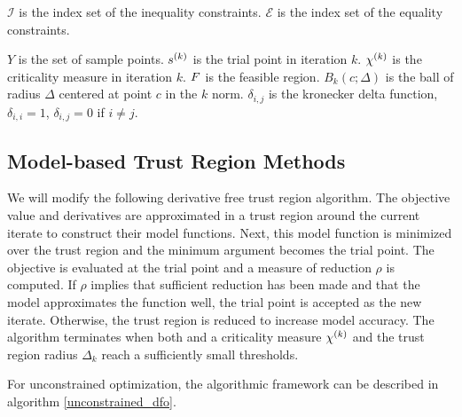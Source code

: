 $\mathcal{I}$ is the index set of the inequality constraints.
$\mathcal{E}$ is the index set of the equality constraints.

$Y$ is the set of sample points.
${s}^{(k)}$ is the trial point in iteration $k$.
${\chi^{(k)}}$ is the criticality measure in iteration $k$.
${F}$ is the feasible region.
$B_k(c; \Delta)$ is the ball of radius $\Delta$ centered at point $c$ in the $k$ norm.
$\delta_{i,j}$ is the kronecker delta function, $\delta_{i,i} = 1$, $\delta_{i,j} = 0$ if $i\ne j$.



\subsection{Model-based Trust Region Methods}

We will modify the following derivative free trust region algorithm.
The objective value and derivatives are approximated in a trust region around the current iterate to construct their model functions.
Next, this model function is minimized over the trust region and the minimum argument becomes the trial point.
The objective is evaluated at the trial point and a measure of reduction $\rho$ is computed.
If $\rho$ implies that sufficient reduction has been made and that the model approximates the function well, the trial point is accepted as the new iterate.
Otherwise, the trust region is reduced to increase model accuracy.
The algorithm terminates when both and a criticality measure ${\chi^{(k)}}$ and the trust region radius $\Delta_k$ reach a sufficiently small thresholds.


For unconstrained optimization, the algorithmic framework can be described in algorithm \cref{unconstrained_dfo}.

